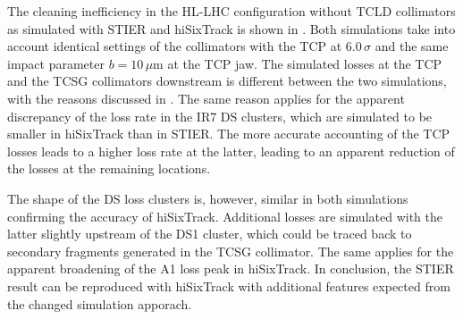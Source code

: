 The cleaning inefficiency in the HL-LHC configuration without TCLD collimators as simulated with STIER and hiSixTrack is shown in . Both simulations take into account identical settings of the collimators with the TCP at 6.0$\,\sigma$ and the same impact parameter $b=10\,\mu$m at the TCP jaw. The simulated losses at the TCP and the TCSG collimators downstream is different between the two simulations, with the reasons discussed in . The same reason applies for the apparent discrepancy of the loss rate in the IR7 DS clusters, which are simulated to be smaller in hiSixTrack than in STIER. The more accurate accounting  of the TCP losses leads to a higher loss rate at the latter, leading to an apparent reduction of the losses at the remaining locations. 

The shape of the DS loss clusters is, however, similar in both simulations confirming the accuracy of hiSixTrack. Additional losses are simulated with the latter slightly upstream of the DS1 cluster, which could be traced back to secondary fragments generated in the TCSG collimator. The same applies for the apparent broadening of the A1 loss peak in hiSixTrack. In conclusion, the STIER result can be reproduced with hiSixTrack with additional features expected from the changed simulation apporach.  






